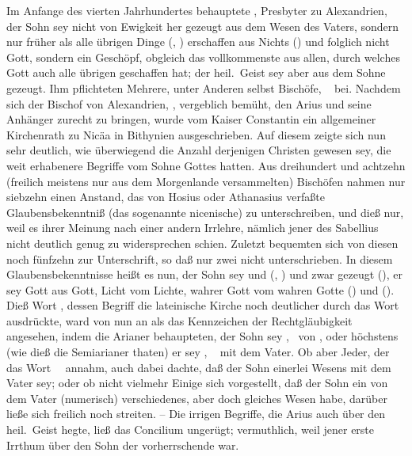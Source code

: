 \begin{aufza}
\item Im Anfange des vierten Jahrhundertes behauptete , Presbyter zu Alexandrien, der Sohn sey nicht von Ewigkeit her gezeugt aus dem Wesen des Vaters, sondern nur früher als alle übrigen Dinge (, ) erschaffen aus Nichts () und folglich nicht Gott, sondern ein Geschöpf, obgleich das vollkommenste aus allen, durch welches Gott auch alle übrigen geschaffen hat; der heil.\ Geist sey aber aus dem Sohne gezeugt. Ihm pflichteten Mehrere, unter Anderen selbst Bischöfe, \zB\  bei. Nachdem sich der Bischof von Alexandrien, , vergeblich bemüht, den Arius und seine Anhänger zurecht zu bringen, wurde vom Kaiser Constantin ein allgemeiner Kirchenrath zu Nicäa in Bithynien ausgeschrieben. Auf diesem zeigte sich nun sehr deutlich, wie überwiegend die Anzahl derjenigen Christen gewesen sey, die weit erhabenere Begriffe vom Sohne Gottes hatten. Aus dreihundert und achtzehn (freilich meistens nur aus dem Morgenlande versammelten) Bischöfen nahmen nur siebzehn einen Anstand, das von Hosius oder Athanasius verfaßte Glaubensbekenntniß (das sogenannte nicenische) zu unterschreiben, und dieß nur, weil es ihrer Meinung nach einer andern Irrlehre, nämlich jener des Sabellius nicht deutlich genug zu widersprechen schien. Zuletzt bequemten sich von diesen noch fünfzehn zur Unterschrift, so daß nur zwei nicht unterschrieben. In diesem Glaubensbekenntnisse heißt es nun, der Sohn sey  und  (, ) und zwar gezeugt  (), er sey Gott aus Gott, Licht vom Lichte, wahrer Gott vom wahren Gotte () und  (). Dieß Wort , dessen Begriff die lateinische Kirche noch deutlicher durch das Wort  ausdrückte, ward von nun an als das Kennzeichen der Rechtgläubigkeit angesehen, indem die Arianer behaupteten, der Sohn sey , \dh\ von , oder höchstens (wie dieß die Semiarianer thaten) er sey , \dh\  mit dem Vater. Ob aber Jeder, der das Wort~\  annahm, auch dabei dachte, daß der Sohn einerlei Wesens mit dem Vater sey; oder ob nicht vielmehr Einige sich vorgestellt, daß der Sohn ein von dem Vater (numerisch) verschiedenes, aber doch gleiches Wesen habe, darüber ließe sich freilich noch streiten. -- Die irrigen Begriffe, die Arius auch über den heil.\ Geist hegte, ließ das Concilium ungerügt; vermuthlich, weil jener erste Irrthum über den Sohn der vorherrschende war.

\end{aufza}
